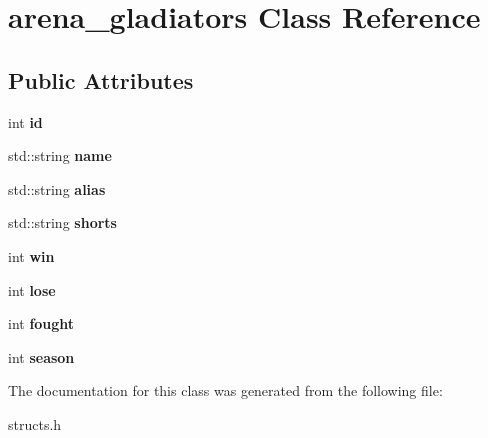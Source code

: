 \hypertarget{classarena__gladiators}{\section{arena\-\_\-gladiators Class Reference}
\label{classarena__gladiators}
}
\subsection*{Public Attributes}
\begin{DoxyCompactItemize}
\item 
\hypertarget{classarena__gladiators_a8ca809345e524c1e1c6aec14f8e22a44}{int {\bfseries id}}\label{classarena__gladiators_a8ca809345e524c1e1c6aec14f8e22a44}

\item 
\hypertarget{classarena__gladiators_abbfb775525439f543d6a604347418340}{std\-::string {\bfseries name}}\label{classarena__gladiators_abbfb775525439f543d6a604347418340}

\item 
\hypertarget{classarena__gladiators_a123efad23d061b043c9d09f083b18c2f}{std\-::string {\bfseries alias}}\label{classarena__gladiators_a123efad23d061b043c9d09f083b18c2f}

\item 
\hypertarget{classarena__gladiators_a280427370690bf3901a8f10608956bcc}{std\-::string {\bfseries shorts}}\label{classarena__gladiators_a280427370690bf3901a8f10608956bcc}

\item 
\hypertarget{classarena__gladiators_aa60a43b4f54e94e1df157113274ac496}{int {\bfseries win}}\label{classarena__gladiators_aa60a43b4f54e94e1df157113274ac496}

\item 
\hypertarget{classarena__gladiators_a43b6183e03a4552bbf147bc7825868b5}{int {\bfseries lose}}\label{classarena__gladiators_a43b6183e03a4552bbf147bc7825868b5}

\item 
\hypertarget{classarena__gladiators_a2d3441bfc9a46e7ccf83d2328edd1981}{int {\bfseries fought}}\label{classarena__gladiators_a2d3441bfc9a46e7ccf83d2328edd1981}

\item 
\hypertarget{classarena__gladiators_a45308edb01250c153c628713bc14e5f4}{int {\bfseries season}}\label{classarena__gladiators_a45308edb01250c153c628713bc14e5f4}

\end{DoxyCompactItemize}


The documentation for this class was generated from the following file\-:\begin{DoxyCompactItemize}
\item 
structs.\-h\end{DoxyCompactItemize}
